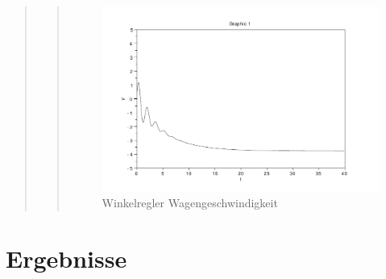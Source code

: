 \begin{quote}
\begin{quote}
        \begin{figure}[H]
        \centering
            \includegraphics[scale=0.7, trim = 0cm 0cm 0cm 0cm, clip]{./Bilder/Winkelregler_Wagengeschwindigkeit}
                \caption{Winkelregler Wagengeschwindigkeit}
        \end{figure}
        
    \end{quote}  %
	
\end{quote} %


\section{Ergebnisse}
\begin{quote}
 
\end{quote} %




%     
%         

